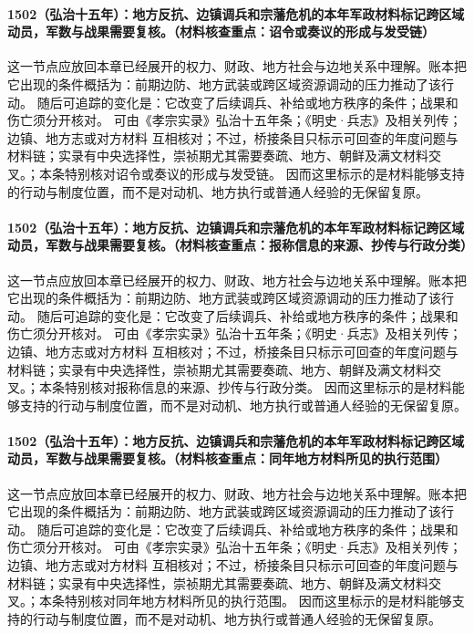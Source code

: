 \paragraph{1502（弘治十五年）：地方反抗、边镇调兵和宗藩危机的本年军政材料标记跨区域动员，军数与战果需要复核。（材料核查重点：诏令或奏议的形成与发受链）} 这一节点应放回本章已经展开的权力、财政、地方社会与边地关系中理解。账本把它出现的条件概括为：前期边防、地方武装或跨区域资源调动的压力推动了该行动。 随后可追踪的变化是：它改变了后续调兵、补给或地方秩序的条件；战果和伤亡须分开核对。 可由《孝宗实录》弘治十五年条；《明史·兵志》及相关列传；边镇、地方志或对方材料 互相核对；不过，桥接条目只标示可回查的年度问题与材料链；实录有中央选择性，崇祯期尤其需要奏疏、地方、朝鲜及满文材料交叉。；本条特别核对诏令或奏议的形成与发受链。 因而这里标示的是材料能够支持的行动与制度位置，而不是对动机、地方执行或普通人经验的无保留复原。

\paragraph{1502（弘治十五年）：地方反抗、边镇调兵和宗藩危机的本年军政材料标记跨区域动员，军数与战果需要复核。（材料核查重点：报称信息的来源、抄传与行政分类）} 这一节点应放回本章已经展开的权力、财政、地方社会与边地关系中理解。账本把它出现的条件概括为：前期边防、地方武装或跨区域资源调动的压力推动了该行动。 随后可追踪的变化是：它改变了后续调兵、补给或地方秩序的条件；战果和伤亡须分开核对。 可由《孝宗实录》弘治十五年条；《明史·兵志》及相关列传；边镇、地方志或对方材料 互相核对；不过，桥接条目只标示可回查的年度问题与材料链；实录有中央选择性，崇祯期尤其需要奏疏、地方、朝鲜及满文材料交叉。；本条特别核对报称信息的来源、抄传与行政分类。 因而这里标示的是材料能够支持的行动与制度位置，而不是对动机、地方执行或普通人经验的无保留复原。

\paragraph{1502（弘治十五年）：地方反抗、边镇调兵和宗藩危机的本年军政材料标记跨区域动员，军数与战果需要复核。（材料核查重点：同年地方材料所见的执行范围）} 这一节点应放回本章已经展开的权力、财政、地方社会与边地关系中理解。账本把它出现的条件概括为：前期边防、地方武装或跨区域资源调动的压力推动了该行动。 随后可追踪的变化是：它改变了后续调兵、补给或地方秩序的条件；战果和伤亡须分开核对。 可由《孝宗实录》弘治十五年条；《明史·兵志》及相关列传；边镇、地方志或对方材料 互相核对；不过，桥接条目只标示可回查的年度问题与材料链；实录有中央选择性，崇祯期尤其需要奏疏、地方、朝鲜及满文材料交叉。；本条特别核对同年地方材料所见的执行范围。 因而这里标示的是材料能够支持的行动与制度位置，而不是对动机、地方执行或普通人经验的无保留复原。

